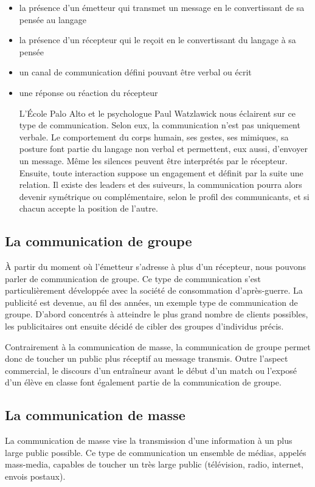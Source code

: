 \documentclass[a4paper, 11pt, oneside]{book}
\begin{document}
\begin{itemize}
    \item la présence d’un émetteur qui transmet un message en le convertissant de sa pensée au langage
    \item la présence d’un récepteur qui le reçoit en le convertissant du langage à sa pensée
    \item un canal de communication défini pouvant être verbal ou écrit
    \item une réponse ou réaction du récepteur

L’École Palo Alto et le psychologue Paul Watzlawick nous éclairent sur ce type de communication. Selon eux, la communication n’est pas uniquement verbale. Le comportement du corps humain, ses gestes, ses mimiques, sa posture font partie du langage non verbal et permettent, eux aussi, d’envoyer un message. Même les silences peuvent être interprétés par le récepteur. Ensuite, toute interaction suppose un engagement et définit par la suite une relation. Il existe des leaders et des suiveurs, la communication pourra alors devenir symétrique ou complémentaire, selon le profil des communicants, et si chacun accepte la position de l’autre.
\end{itemize}

\subsection{La communication de groupe}
À partir du moment où l’émetteur s’adresse à plus d’un récepteur, nous pouvons parler de communication de groupe. Ce type de communication s’est particulièrement développée avec la société de consommation d’après-guerre. La publicité est devenue, au fil des années, un exemple type de communication de groupe. D’abord concentrés à atteindre le plus grand nombre de clients possibles, les publicitaires ont ensuite décidé de cibler des groupes d’individus précis.

Contrairement à la communication de masse, la communication de groupe permet donc de toucher un public plus réceptif au message transmis. Outre l’aspect commercial, le discours d’un entraîneur avant le début d’un match ou l’exposé d’un élève en classe font également partie de la communication de groupe.

\subsection{La communication de masse}
La communication de masse vise la transmission d’une information à un plus large public possible. Ce type de communication un ensemble de médias, appelés mass-media, capables de toucher un très large public (télévision, radio, internet, envois postaux).
\end{document}
